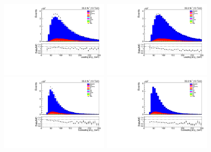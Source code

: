 \begin{figure}[tbp]
\centering
\includegraphics[width=0.47\textwidth]{figs/background-estimation/plots/unblinded/DY_control_old_prompt_ee_ttbarInc/leadingJetPt_SingleTop_jetSel_ee.pdf}
\includegraphics[width=0.47\textwidth]{figs/background-estimation/plots/unblinded/DY_control_old_prompt_ee_DYamcatnlo/leadingJetPt_SingleTop_jetSel_ee.pdf}
\\
\includegraphics[width=0.47\textwidth]{figs/background-estimation/plots/unblinded/DY_control_old_prompt_ee_ttbarInc/secondJetPt_SingleTop_jetSel_ee.pdf}
\includegraphics[width=0.47\textwidth]{figs/background-estimation/plots/unblinded/DY_control_old_prompt_ee_DYamcatnlo/secondJetPt_SingleTop_jetSel_ee.pdf}
\\

\end{figure}
